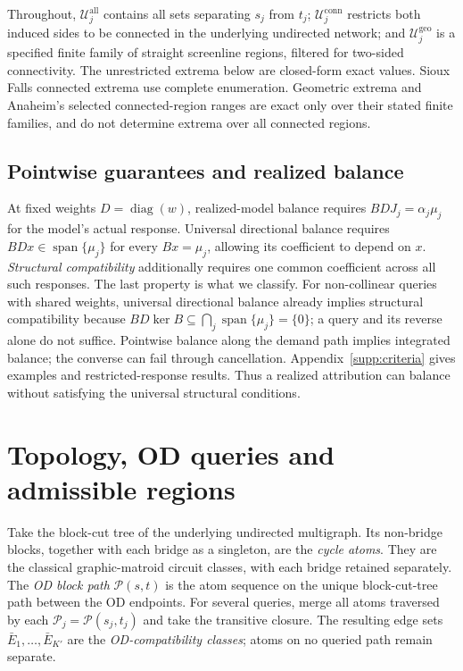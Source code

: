 \documentclass[a4paper,fleqn]{cas-sc}
\begin{document}
Throughout, $\mathcal U_j^{\mathrm{all}}$ contains all sets separating
$s_j$ from $t_j$; $\mathcal U_j^{\mathrm{conn}}$ restricts both induced sides
to be connected in the underlying undirected network; and
$\mathcal U_j^{\mathrm{geo}}$ is a specified finite family of straight
screenline regions, filtered for two-sided connectivity.
The unrestricted extrema below are closed-form exact values. Sioux Falls
connected extrema use complete enumeration. Geometric extrema and Anaheim's
selected connected-region ranges are exact only over their stated finite
families, and do not determine extrema over all connected regions.

\subsection{Pointwise guarantees and realized balance}\label{sec:levels}\label{sec:hierarchy}
At fixed weights $D=\operatorname{diag}(w)$, realized-model balance
requires $BDJ_j=\alpha_j\mu_j$ for the model's actual response.
Universal directional balance requires $BDx\in\operatorname{span}\{\mu_j\}$
for every $Bx=\mu_j$, allowing its coefficient to depend on $x$.
\emph{Structural compatibility} additionally requires one common coefficient
across all such responses. The last property is what we classify.
For non-collinear queries with shared weights, universal directional
balance already implies structural compatibility because
$BD\ker B\subseteq\bigcap_j\operatorname{span}\{\mu_j\}=\{0\}$;
a query and its reverse alone do not suffice.
Pointwise balance along the demand path implies integrated balance;
the converse can fail through cancellation. Appendix~\ref{supp:criteria}
gives examples and restricted-response results. Thus a realized attribution
can balance without satisfying the universal structural conditions.

\section{Topology, OD queries and admissible regions}\label{sec:classification}
Take the block-cut tree of the underlying undirected multigraph.
Its non-bridge blocks, together with each bridge as a singleton,
are the \emph{cycle atoms}. They are the classical graphic-matroid circuit
classes, with each bridge retained separately. The \emph{OD block path}
$\mathcal P(s,t)$ is the atom sequence on the unique block-cut-tree path
between the OD endpoints. For several queries, merge all atoms traversed
by each $\mathcal P_j=\mathcal P(s_j,t_j)$ and take the transitive closure.
The resulting edge sets $\bar E_1,\ldots,\bar E_{K'}$ are the
\emph{OD-compatibility classes}; atoms on no queried path remain separate.
\end{document}
